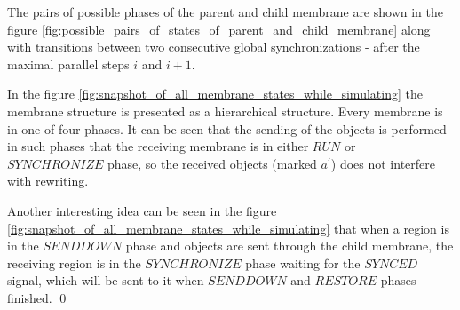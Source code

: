 \begin{dokaz}
  The pairs of possible phases of the parent and child membrane are shown in the figure \ref{fig:possible_pairs_of_states_of_parent_and_child_membrane} along with transitions between two consecutive global synchronizations - after the maximal parallel steps $i$ and $i+1$.

  In the figure \ref{fig:snapshot_of_all_membrane_states_while_simulating} the membrane structure is presented as a hierarchical structure. Every membrane is in one of four phases. It can be seen that the sending of the objects is performed in such phases that the receiving membrane is in either $\mathit{RUN}$ or $\mathit{SYNCHRONIZE}$ phase, so the received objects (marked $a^\prime$) does not interfere with rewriting.

  Another interesting idea can be seen in the figure \ref{fig:snapshot_of_all_membrane_states_while_simulating} that when a region is in the $\mathit{SENDDOWN}$ phase and objects are sent through the child membrane, the receiving region is in the $\mathit{SYNCHRONIZE}$ phase waiting for the $\mathit{SYNCED}$ signal, which will be sent to it when $\mathit{SENDDOWN}$ and $\mathit{RESTORE}$ phases finished. \qed

\end{dokaz}
